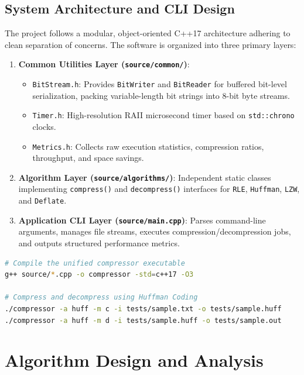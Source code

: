 \documentclass[12pt,a4paper]{article}
\begin{document}
\subsection{System Architecture and CLI Design}
The project follows a modular, object-oriented C++17 architecture adhering to clean separation of concerns. The software is organized into three primary layers:
\begin{enumerate}
    \item \textbf{Common Utilities Layer (\texttt{source/common/})}:
    \begin{itemize}
        \item \texttt{BitStream.h}: Provides \texttt{BitWriter} and \texttt{BitReader} for buffered bit-level serialization, packing variable-length bit strings into 8-bit byte streams.
        \item \texttt{Timer.h}: High-resolution RAII microsecond timer based on \texttt{std::chrono} clocks.
        \item \texttt{Metrics.h}: Collects raw execution statistics, compression ratios, throughput, and space savings.
    \end{itemize}
    \item \textbf{Algorithm Layer (\texttt{source/algorithms/})}:
    Independent static classes implementing \texttt{compress()} and \texttt{decompress()} interfaces for \texttt{RLE}, \texttt{Huffman}, \texttt{LZW}, and \texttt{Deflate}.
    \item \textbf{Application CLI Layer (\texttt{source/main.cpp})}:
    Parses command-line arguments, manages file streams, executes compression/decompression jobs, and outputs structured performance metrics.
\end{enumerate}

\begin{lstlisting}[language=bash, caption={CLI Command Usage Examples}]
# Compile the unified compressor executable
g++ source/*.cpp -o compressor -std=c++17 -O3

# Compress and decompress using Huffman Coding
./compressor -a huff -m c -i tests/sample.txt -o tests/sample.huff
./compressor -a huff -m d -i tests/sample.huff -o tests/sample.out
\end{lstlisting}

\section{Algorithm Design and Analysis}
\end{document}
